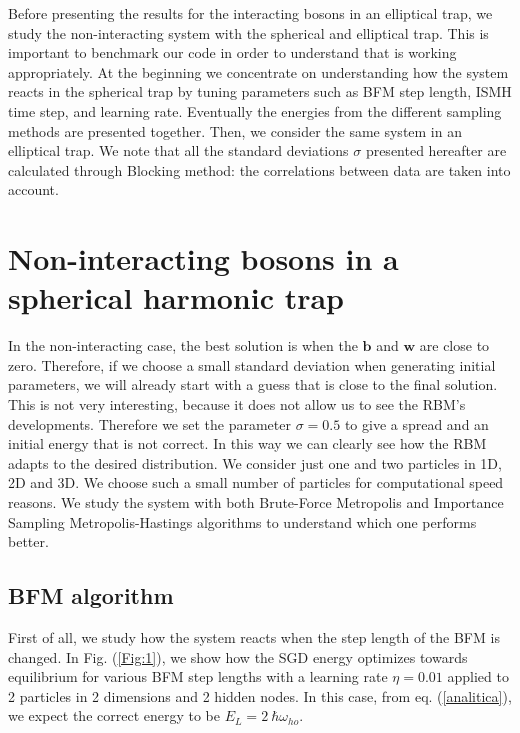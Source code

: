 Before presenting the results for the interacting bosons in an elliptical trap, we study the non-interacting system with the spherical and elliptical trap. This is important to benchmark our code in order to understand that is working appropriately. At the beginning we concentrate on understanding how the system reacts in the spherical trap by tuning parameters such as BFM step length, ISMH time step, and learning rate. Eventually the energies from the different sampling methods are presented together. Then, we consider the same system in an elliptical trap. 
We note that all the standard deviations $\sigma$ presented hereafter are calculated through Blocking method: the correlations between data are taken into account. 

\section{Non-interacting bosons in a spherical harmonic trap}

In the non-interacting case, the best solution is when the $\boldsymbol{b}$ and $\boldsymbol{w}$ are close to zero. Therefore, if we choose a small standard deviation when generating initial  parameters, we will already start with a guess that is close to the final solution. This is not very interesting, because it does not allow us to see the RBM's developments. Therefore we set the parameter $\sigma=0.5$ to give a spread and an initial energy that is not correct. In this way we can clearly see how the RBM adapts to the desired distribution. We consider just one and two particles in 1D, 2D and 3D. We choose such a small number of particles for computational speed reasons. We study the system with both Brute-Force Metropolis and Importance Sampling Metropolis-Hastings algorithms to understand which one performs better.

\subsection{BFM algorithm}
First of all, we study how the system reacts when the step length of the BFM is changed. In Fig. (\ref{Fig:1}), we show how the SGD energy optimizes towards equilibrium for various BFM step lengths with a learning rate $\eta=0.01$ applied to 2 particles in 2 dimensions and 2 hidden nodes. In this case, from eq. (\ref{analitica}), we expect the correct energy to be $E_L=2\ \hbar\omega_{ho}$. 

